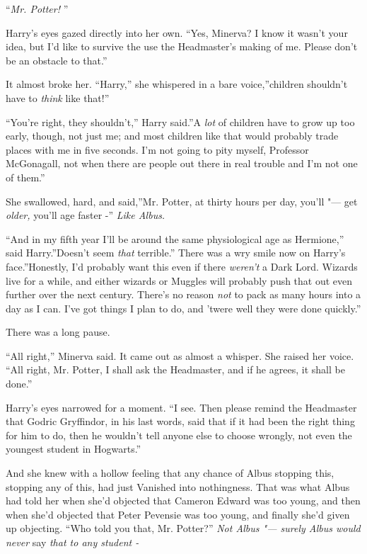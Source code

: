 ``\emph{Mr. Potter!} ''

Harry's eyes gazed directly into her own. ``Yes, Minerva? I know it
wasn't your idea, but I'd like to survive the use the Headmaster's
making of me. Please don't be an obstacle to that.''

It almost broke her. ``Harry,'' she whispered in a bare voice,''children
shouldn't have to \emph{think} like that!''

``You're right, they shouldn't,'' Harry said.''A \emph{lot} of children
have to grow up too early, though, not just me; and most children like
that would probably trade places with me in five seconds. I'm not going
to pity myself, Professor McGonagall, not when there are people out
there in real trouble and I'm not one of them.''

She swallowed, hard, and said,''Mr. Potter, at thirty hours per day,
you'll "--- get \emph{older,} you'll age faster -'' \emph{Like Albus.}

``And in my fifth year I'll be around the same physiological age as
Hermione,'' said Harry.''Doesn't seem \emph{that} terrible.'' There was
a wry smile now on Harry's face.''Honestly, I'd probably want this even
if there \emph{weren't} a Dark Lord. Wizards live for a while, and
either wizards or Muggles will probably push that out even further over
the next century. There's no reason \emph{not} to pack as many hours
into a day as I can. I've got things I plan to do, and 'twere well they
were done quickly.''

There was a long pause.

``All right,'' Minerva said. It came out as almost a whisper. She raised
her voice. ``All right, Mr. Potter, I shall ask the Headmaster, and if
he agrees, it shall be done.''

Harry's eyes narrowed for a moment. ``I see. Then please remind the
Headmaster that Godric Gryffindor, in his last words, said that if it
had been the right thing for him to do, then he wouldn't tell anyone
else to choose wrongly, not even the youngest student in Hogwarts.''

And she knew with a hollow feeling that any chance of Albus stopping
this, stopping any of this, had just Vanished into nothingness. That was
what Albus had told her when she'd objected that Cameron Edward was too
young, and then when she'd objected that Peter Pevensie was too young,
and finally she'd given up objecting. ``Who told you that, Mr. Potter?''
\emph{Not Albus "--- surely Albus would never} say \emph{that to any
student -}

